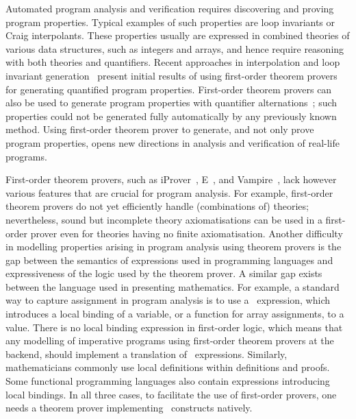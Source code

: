 
Automated program analysis and verification requires
discovering and proving program properties. Typical examples of such properties are loop invariants or Craig interpolants. These properties usually are expressed in combined theories of various data structures, such as integers and arrays, and hence require reasoning with both theories and quantifiers. Recent approaches in interpolation and loop invariant generation~\cite{McMillan08,fase2009,hoder2012popl} present initial results of using first-order theorem provers for generating quantified program properties. First-order theorem provers can also be used to generate program properties with quantifier alternations~\cite{fase2009}; such properties could not be generated fully automatically by any previously known method.
Using first-order theorem prover to generate, and not only prove program properties, opens new directions in analysis and verification of real-life programs.

First-order theorem provers, such as iProver~\cite{iProver}, E~\cite{E13}, and Vampire~\cite{Vampire13}, lack however various features that are crucial for program analysis. For example, first-order theorem provers do not yet efficiently handle (combinations of) theories;
nevertheless, sound but incomplete theory axiomatisations can be used in a first-order prover even for theories having no finite axiomatisation. Another difficulty in modelling properties arising in program analysis using theorem provers is the gap between the semantics of expressions used in programming languages and expressiveness of the logic used by the theorem prover. A similar gap exists between the language used in presenting mathematics. For example, a standard way to capture assignment in program analysis is to use a \LETIN\ expression, which introduces a local binding of a variable, or a function for array assignments, to a value. There is no local binding expression in first-order logic, which means that any modelling of imperative programs using first-order theorem provers at the backend, should implement a translation of \LETIN\ expressions. Similarly, mathematicians commonly use local definitions within definitions and proofs. Some functional programming languages also contain expressions introducing local bindings. In all three cases, to facilitate the use of first-order provers, one needs a theorem prover implementing \LETIN\ constructs natively.

